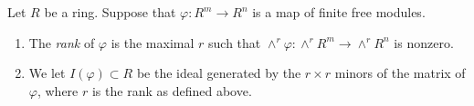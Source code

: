 \begin{definition}
\label{definition-rank}
Let $R$ be a ring. Suppose that $\varphi : R^m \to R^n$ is a map
of finite free modules.
\begin{enumerate}
\item The {\it rank} of $\varphi$ is the maximal $r$ such that
$\wedge^r \varphi : \wedge^r R^m \to \wedge^r R^n$ is nonzero.
\item We let $I(\varphi) \subset R$ be the ideal generated by
the $r \times r$ minors of the matrix of $\varphi$, where $r$
is the rank as defined above.
\end{enumerate}
\end{definition}